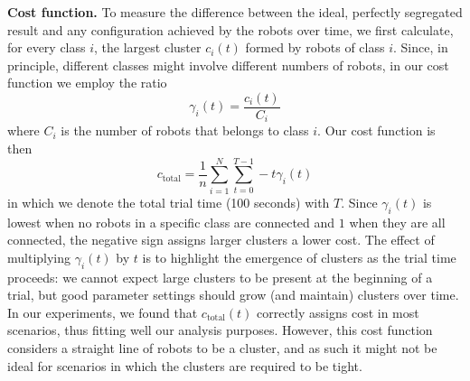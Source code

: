 \documentclass[conference]{IEEEtran}
\newcommand{\myparagraph}[1]{\textbf{#1.}}
\begin{document}
\myparagraph{Cost function}
To measure the difference between the ideal, perfectly segregated result and any
configuration achieved by the robots over time, we first calculate, for every
class $i$, the largest cluster $c_i(t)$ formed by robots of class $i$.  Since,
in principle, different classes might involve different numbers of robots, in
our cost function we employ the ratio
$$
\gamma_i(t) = \frac{c_i(t)}{C_i}
$$
where $C_i$ is the number of robots that belongs to class $i$. Our cost function
is then
\begin{equation}
  \label{eq:cost_function}
  c_{\text{total}} =  \frac{1}{n}\sum_{i=1}^N\sum_{t=0}^{T-1} -t \gamma_i(t)
\end{equation}
in which we denote the total trial time (100 seconds) with $T$. Since
$\gamma_i(t)$ is lowest when no robots in a specific class are connected and $1$
when they are all connected, the negative sign assigns larger clusters a lower
cost. The effect of multiplying $\gamma_i(t)$ by $t$ is to highlight the
emergence of clusters as the trial time proceeds: we cannot expect large
clusters to be present at the beginning of a trial, but good parameter settings
should grow (and maintain) clusters over time. In our experiments, we found that
$c_{\text{total}}(t)$ correctly assigns cost in most scenarios, thus fitting
well our analysis purposes. However, this cost function considers a straight
line of robots to be a cluster, and as such it might not be ideal for scenarios
in which the clusters are required to be tight.
\end{document}
